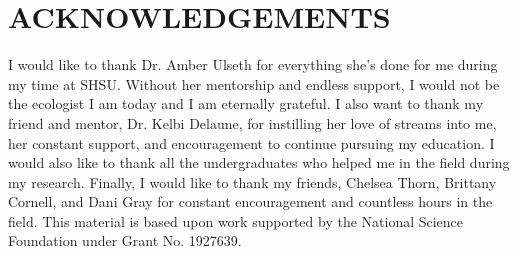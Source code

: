 %

\chapter*{ACKNOWLEDGEMENTS}

I would like to thank Dr. Amber Ulseth for everything she's done for me during my time at SHSU. Without her mentorship and endless support, I would not be the ecologist I am today and I am eternally grateful. I also want to thank my friend and mentor, Dr. Kelbi Delaune, for instilling her love of streams into me, her constant support, and encouragement to continue pursuing my education. I would also like to thank all the undergraduates who helped me in the field during my research. Finally, I would like to thank my friends, Chelsea Thorn, Brittany Cornell, and Dani Gray for constant encouragement and countless hours in the field. This material is based upon work supported by the National Science Foundation under Grant No. 1927639.
\endinput
